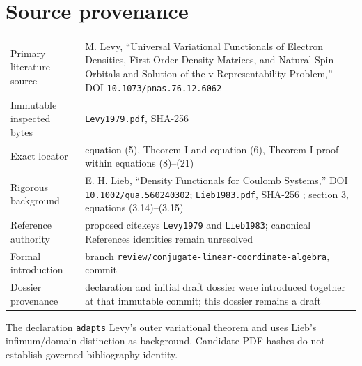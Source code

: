 \section{Source provenance}
\begin{tabularx}{\textwidth}{@{}lY@{}}
\toprule
Primary literature source & M. Levy, ``Universal Variational Functionals of Electron Densities, First-Order Density Matrices, and Natural Spin-Orbitals and Solution of the v-Representability Problem,'' DOI \texttt{10.1073/pnas.76.12.6062} \\
Immutable inspected bytes & \texttt{Levy1979.pdf}, SHA-256  \\
Exact locator & equation (5), Theorem I and equation (6), Theorem I proof within equations (8)--(21) \\
Rigorous background & E. H. Lieb, ``Density Functionals for Coulomb Systems,'' DOI \texttt{10.1002/qua.560240302}; \texttt{Lieb1983.pdf}, SHA-256 ; section 3, equations (3.14)--(3.15) \\
Reference authority & proposed citekeys \texttt{Levy1979} and \texttt{Lieb1983}; canonical References identities remain unresolved \\
Formal introduction & branch \texttt{review/conjugate-linear-coordinate-algebra}, commit  \\
Dossier provenance & declaration and initial draft dossier were introduced together at that immutable commit; this dossier remains a draft \\
\bottomrule
\end{tabularx}
The declaration \texttt{adapts} Levy's outer variational theorem and uses Lieb's infimum/domain
distinction as background.  Candidate PDF hashes do not establish governed bibliography identity.

